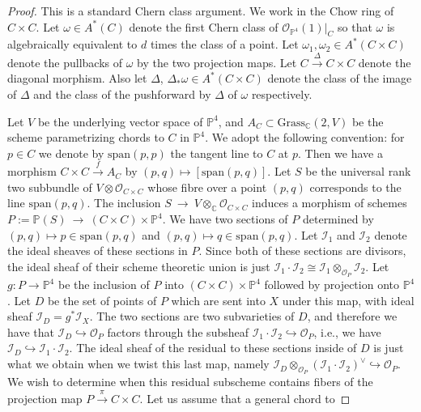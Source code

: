 \documentclass[twoside,12pt,reqno]{amsart}
\theoremstyle{plain}
\theoremstyle{definition}
\newcommand{\CC}{\mathbb{C}}
\newcommand{\PP}{\mathbb{P}}
\newcommand{\GR}[3]{\text{Grass}_{#1}(#2,#3)}
\def\ps{\vspace{4pt}}
\newcommand{\OO}{\mathcal O}
\renewcommand{\xrightarrow}[1]{\mathbin{\stackrel{#1}{\longrightarrow}}}
\begin{document}
\begin{proof}  This is a standard Chern class
argument.  We work in the Chow ring of $C\times C$.  Let
$\omega\in A^*(C)$ denote the first Chern class of $\OO_{\PP^4}(1)|_C$ so that
$\omega$ is algebraically equivalent to $d$ times the class of a
point.  Let $\omega_1,\omega_2\in A^*(C\times C)$ denote the
pullbacks of $\omega$ by the two projection maps.  Let
$C\xrightarrow{\Delta} C\times C$ denote the diagonal morphism.
Also let $\Delta$, $\Delta_*\omega\in A^*(C\times C)$ denote the
class of the image of $\Delta$ and the class of the pushforward by
$\Delta$ of $\omega$ respectively.  

\ps

Let $V$ be the underlying vector space of $\PP^4$, and 
$A_C\subset \GR{\CC}{2}{V}$ be the scheme parametrizing chords
to $C$ in $\PP^4$.  We adopt the following convention: for $p\in C$ we denote by
$\text{span}(p,p)$ the tangent line to $C$ at $p$.  
Then
we have a morphism $C\times C\xrightarrow{f} A_C$ by
$(p,q)\mapsto[\text{span}(p,q)]$.  Let $S$ be the universal
rank two subbundle of $V\otimes \OO_{C\times C}$ whose fibre over a point
$(p,q)$ corresponds to the line $\text{span}(p,q)$.
The inclusion $S~\rightarrow~
V\otimes_\CC\OO_ {C\times C}$ induces a morphism of schemes
$P:=\PP(S)~\rightarrow~ (C\times C)\times \PP^4$.
We have two sections of $P$ determined by $(p,q)\mapsto
p\in\text{span}(p,q)$ and $(p,q)\mapsto q\in\text{span}(p,q)$.  Let
$\mathcal{I}_1$ and $\mathcal{I}_2$ denote the ideal sheaves of these sections in $P$.
Since both of these sections are divisors, the ideal sheaf of their
scheme theoretic union is just $\mathcal{I}_1\cdot \mathcal{I}_2\cong \mathcal{I}_1\otimes_{\OO_P}
\mathcal{I}_2$.  
Let $g:P\rightarrow \PP^4$ be the inclusion of $P$ into 
$(C\times C)\times \PP^4$ followed by projection onto $\PP^4$.
Let $D$ be the set of points of $P$ which are sent into $X$ under this map,
with ideal sheaf $\mathcal{I}_D=g^{*}\mathcal{I}_X$. 
 The two sections are two subvarieties of $D$, and  therefore we have that $\mathcal{I}_D\hookrightarrow
\OO_P$ factors through the subsheaf $\mathcal{I}_1\cdot \mathcal{I}_2\hookrightarrow
\OO_P$, i.e., we have $\mathcal{I}_D\hookrightarrow \mathcal{I}_1\cdot \mathcal{I}_2$.  The ideal
sheaf of the residual to these sections inside of $D$ is just what we
obtain when we twist this last map, namely
$\mathcal{I}_D\otimes_{\OO_P}(\mathcal{I}_1\cdot \mathcal{I}_2)^\vee\hookrightarrow \OO_P$.  We wish
to determine when this residual subscheme contains fibers of the projection map
$P\xrightarrow {\pi}C\times C$.  Let us assume that a general chord to 

\end{proof}
\end{document}
